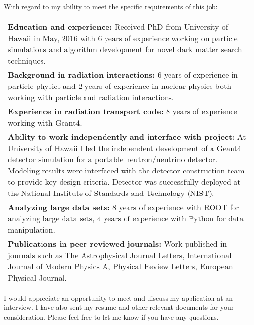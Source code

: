 \documentclass[12pt,letterpaper,sans]{moderncv}        %
\begin{document}
With regard to my ability to meet the specific requirements of this job:
\noindent\begin{tabularx}{\linewidth}{@{{}\textbullet\enskip}X@{\quad}@{}}
	\textbf{Education and experience:} Received PhD from
	University of Hawaii in May, 2016 with 6 years of experience working on
	particle simulations and algorithm development for novel dark
	matter search techniques.\\
	\textbf{Background in radiation interactions:} 6 years of experience in
	particle physics and 2 years of experience in nuclear physics both working
	with particle and radiation interactions.\\
	\textbf{Experience in radiation transport code:} 8 years of experience
	working with Geant4.\\
	\textbf{Ability to work independently and interface with project:} At
	University of Hawaii I led the independent development of a Geant4 detector
	simulation for a portable neutron/neutrino detector. Modeling results were
	interfaced with the detector construction team to provide key design
	criteria. Detector was successfully deployed at the National Institute of
	Standards and Technology (NIST).\\
	\textbf{Analyzing large data sets:} 8 years of experience with ROOT for
	analyzing large data sets, 4 years of experience with Python for data
	manipulation.\\
	\textbf{Publications in peer reviewed journals:}
	Work published in journals such as The Astrophysical Journal Letters,
	International Journal of Modern Physics A, Physical Review Letters,
	European Physical Journal.\\
\end{tabularx}


I would appreciate an opportunity to meet and discuss my application at an
interview. I have also sent my resume and other relevant documents for your
consideration. Please feel free to let me know if you have any questions.

\makeletterclosing
\end{document}
